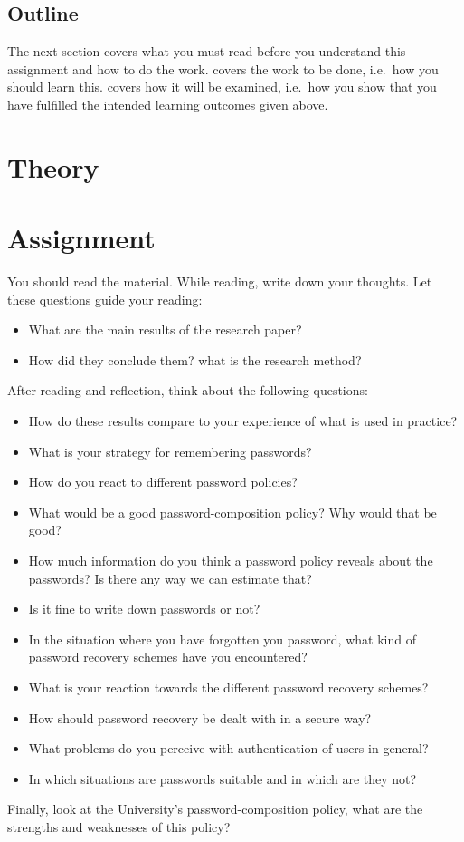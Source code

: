 \subsection{Outline}

The next section covers what you must read before you understand this 
assignment and how to do the work.
 covers the work to be done, i.e.~how you should learn this.
 covers how it will be examined, i.e.~how you show that you have 
fulfilled the intended learning outcomes given above.


\section{Theory}%
\label{sec:theory}




\section{Assignment}%
\label{sec:tasks}

You should read the material.
While reading, write down your thoughts.
Let these questions guide your reading:
\begin{itemize}
  \item What are the main results of the research paper?
  \item How did they conclude them?
    \Ie what is the research method?
\end{itemize}
After reading and reflection, think about the following questions:
\begin{itemize}
  \item How do these results compare to your experience of what is used in 
    practice?
  \item What is your strategy for remembering passwords?
  \item How do you react to different password policies?
  \item What would be a good password-composition policy?
    Why would that be good?
  \item How much information do you think a password policy reveals about the 
    passwords?
    Is there any way we can estimate that?
  \item Is it fine to write down passwords or not?
  \item In the situation where you have forgotten you password,
  	what kind of password recovery schemes have you encountered?
  \item What is your reaction towards the different password recovery schemes?  
  \item How should password recovery be dealt with in a secure way?
  \item What problems do you perceive with authentication of users in general?
  \item In which situations are passwords suitable and in which are they not?
\end{itemize}
Finally, look at the University's password-composition policy, what are the 
strengths and weaknesses of this policy?

